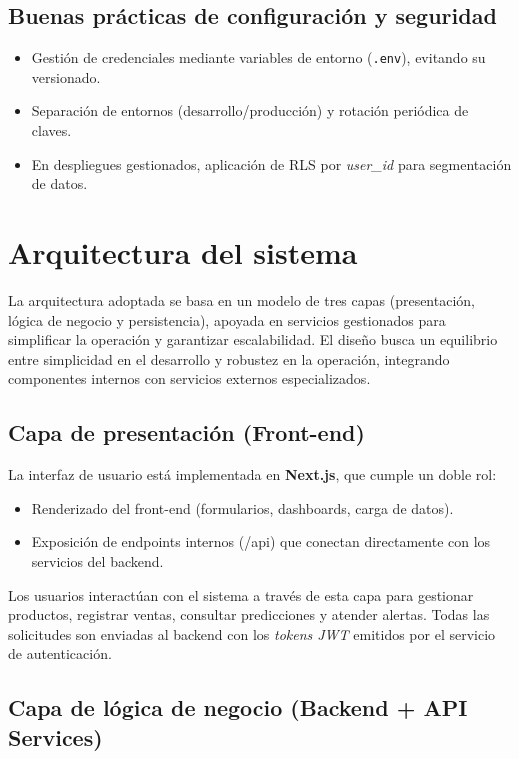 \subsection{Buenas prácticas de configuración y seguridad}
\begin{itemize}
    \item Gestión de credenciales mediante variables de entorno (\texttt{.env}), evitando su versionado.
    \item Separación de entornos (desarrollo/producción) y rotación periódica de claves.
    \item En despliegues gestionados, aplicación de RLS por \textit{user\_id} para segmentación de datos.
\end{itemize}




\section{Arquitectura del sistema}

La arquitectura adoptada se basa en un modelo de tres capas 
(presentación, lógica de negocio y persistencia), apoyada en 
servicios gestionados para simplificar la operación y garantizar 
escalabilidad. El diseño busca un equilibrio entre simplicidad 
en el desarrollo y robustez en la operación, integrando 
componentes internos con servicios externos especializados.

\subsection{Capa de presentación (Front-end)}

La interfaz de usuario está implementada en \textbf{Next.js}, que cumple un doble rol:
\begin{itemize}
    \item Renderizado del front-end (formularios, dashboards, carga de datos).
    \item Exposición de endpoints internos (/api) que conectan directamente con los servicios del backend.
\end{itemize}

Los usuarios interactúan con el sistema a través de esta capa 
para gestionar productos, registrar ventas, consultar predicciones 
y atender alertas. Todas las solicitudes son enviadas al backend 
con los \textit{tokens JWT} emitidos por el servicio de autenticación.

\subsection{Capa de lógica de negocio (Backend + API Services)}

